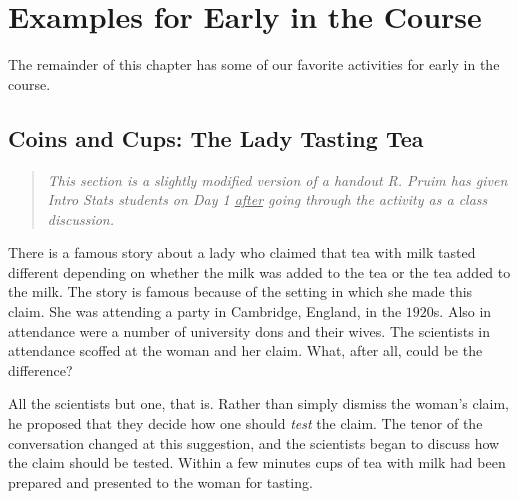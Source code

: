 \section{ Examples for Early in the Course }
The remainder of this chapter has some of our favorite activities for early 
in the course.  


\subsection{Coins and Cups: The Lady Tasting Tea}
\label{sec:lady-tasting-tea}

\begin{quote}
\emph{This section is a slightly modified version of a handout R. Pruim
has given Intro Stats students on Day 1 \underline{after} going through
the activity as a class discussion.  
}
\end{quote}


There is a famous story about a lady who claimed that
tea with milk tasted different depending on whether the milk was 
added to the tea or the tea added to the milk.
The story is famous because of the setting in which she made this claim.  
She was attending a party in Cambridge, England, in the $1920$s.
Also in attendance were a number of university dons and their wives.
The scientists in attendance scoffed at the woman and her claim.
What, after all, could be the difference?

%
All the scientists but one, that is.  Rather than simply dismiss the 
woman's claim, he proposed that they decide how one 
should \emph{test} the claim.  The tenor of the conversation changed at 
this suggestion, and the scientists began to discuss how the claim should be 
tested.  Within a few minutes cups of tea with milk had been prepared and 
presented to the woman for tasting.


